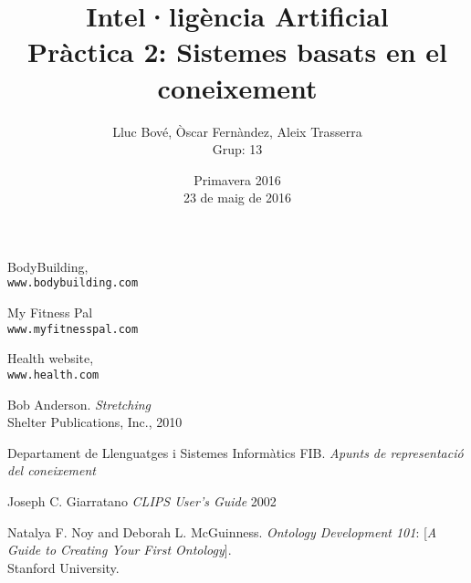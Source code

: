 \documentclass{article}[12pt]
\begin{document}
\title{Intel·ligència Artificial \\ \large
Pràctica 2: Sistemes basats en el coneixement}
\author{Lluc Bové, Òscar Fernàndez, Aleix Trasserra \\
Grup: 13}
\date{ Primavera 2016\\ \large 23 de maig de 2016}
\maketitle
\newpage
{}
\tableofcontents
\newpage








\begin{thebibliography}{9}
 
BodyBuilding,
\\\texttt{www.bodybuilding.com}

My Fitness Pal
\\\texttt{www.myfitnesspal.com}

Health website,
\\\texttt{www.health.com}

Bob Anderson. 
\textit{Stretching}
\\Shelter Publications, Inc., 2010

Departament de Llenguatges i Sistemes Informàtics FIB. 
\textit{Apunts de representació del coneixement}

Joseph C. Giarratano
\textit{CLIPS User's Guide} 2002

Natalya F. Noy and Deborah L. McGuinness. 
\textit{Ontology Development 101}:
[\textit{A Guide to Creating Your
First Ontology}]. 
\\Stanford University.
\end{thebibliography}
\end{document}
